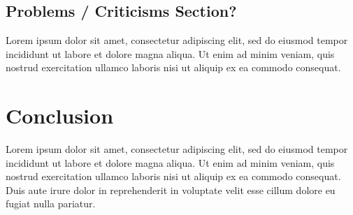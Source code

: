 \documentclass[journal]{IEEEtran}
\begin{document}
\subsection{Problems / Criticisms Section?}
Lorem ipsum dolor sit amet, consectetur adipiscing elit, sed do eiusmod tempor incididunt ut labore et dolore magna aliqua. Ut enim ad minim veniam, quis nostrud exercitation ullamco laboris nisi ut aliquip ex ea commodo consequat.

\section{Conclusion}
Lorem ipsum dolor sit amet, consectetur adipiscing elit, sed do eiusmod tempor incididunt ut labore et dolore magna aliqua. Ut enim ad minim veniam, quis nostrud exercitation ullamco laboris nisi ut aliquip ex ea commodo consequat. Duis aute irure dolor in reprehenderit in voluptate velit esse cillum dolore eu fugiat nulla pariatur.

\end{document}
